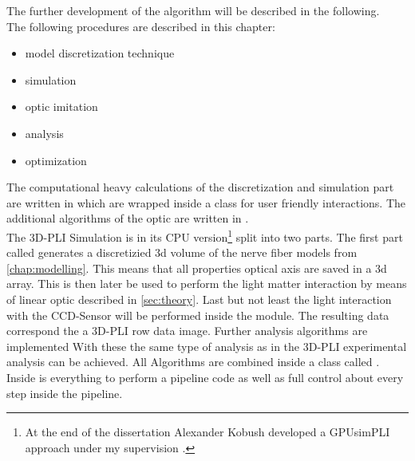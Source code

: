 %
The further development of the algorithm will be described in the following.
\\[\baselineskip]
% 
The following procedures are described in this chapter:
\begin{itemize}[nosep]
    \item model discretization technique
    \item simulation
    \item optic imitation 
    \item analysis
    \item optimization
\end{itemize}
% 
The computational heavy calculations of the discretization and simulation part are written in \cpp{} which are wrapped inside a \python{} class  for user friendly interactions.
The additional algorithms of the optic are written in \python{}.
% 
\\[\baselineskip]
% 
The \ac{3D-PLI} Simulation is in its \ac{CPU} version\footnote{At the end of the dissertation Alexander Kobush developed a GPUsimPLI approach under my supervision \cite{}.} split into two parts.
The first part called   generates a discretizied 3d volume of the nerve fiber models from \cref{chap:modelling}.
This means that all properties \eg{} optical axis are saved in a 3d array.
This  is then later be used to perform the light matter interaction by means of linear optic described in \cref{sec:theory}.
Last but not least the light interaction with the \ac{CCD}-Sensor will be performed inside the  module.
The resulting data correspond the a \ac{3D-PLI} row data image.
Further analysis algorithms are implemented
With these the same type of analysis as in the \ac{3D-PLI} experimental analysis can be achieved.
All Algorithms are combined inside a \python{} class called .
Inside is everything to perform a pipeline code as well as full control about every step inside the pipeline.
% 
